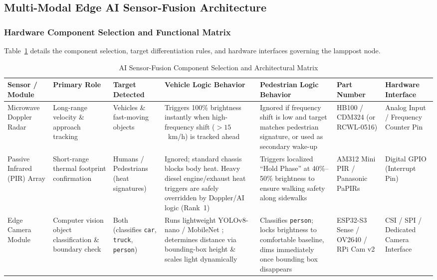 \documentclass[11pt,a4paper]{article}
\begin{document}
\subsection{Multi-Modal Edge AI Sensor-Fusion Architecture}

\subsubsection{Hardware Component Selection and Functional Matrix}
Table~\ref{tab:sensor_matrix} details the component selection, target differentiation rules, and hardware interfaces governing the lamppost node.

\begin{table}[tbp]
\centering
\caption{AI Sensor-Fusion Component Selection and Architectural Matrix}
\label{tab:sensor_matrix}
\footnotesize
\setlength{\tabcolsep}{3pt}
\begin{tabularx}{\textwidth}{>{\raggedright\arraybackslash}p{1.7cm}>{\raggedright\arraybackslash}p{1.9cm}>{\raggedright\arraybackslash}p{1.5cm}>{\raggedright\arraybackslash}X>{\raggedright\arraybackslash}X>{\raggedright\arraybackslash}p{1.8cm}>{\raggedright\arraybackslash}p{1.6cm}}
\toprule
\textbf{Sensor / Module} & \textbf{Primary Role} & \textbf{Target Detected} & \textbf{Vehicle Logic Behavior} & \textbf{Pedestrian Logic Behavior} & \textbf{Part Number} & \textbf{Hardware Interface} \\
\midrule
Microwave Doppler Radar & Long-range velocity \& approach tracking & Vehicles \& fast-moving objects & Triggers 100\% brightness instantly when high-frequency shift (\(>15\)~km/h) is tracked ahead & Ignored if frequency shift is low and target matches pedestrian signature, or used as secondary wake-up & HB100 / CDM324 (or RCWL-0516) & Analog Input / Frequency Counter Pin \\
\midrule
Passive Infrared (PIR) Array & Short-range thermal footprint confirmation & Humans / Pedestrians (heat signatures) & Ignored; standard chassis blocks body heat. Heavy diesel engine/exhaust heat triggers are safely overridden by Doppler/AI logic (Rank~1) & Triggers localized ``Hold Phase'' at 40\%--50\% brightness to ensure walking safety along sidewalks & AM312 Mini PIR / Panasonic PaPIRs & Digital GPIO (Interrupt Pin) \\
\midrule
Edge Camera Module & Computer vision object classification \& boundary check & Both (classifies \texttt{car}, \texttt{truck}, \texttt{person}) & Runs lightweight YOLOv8-nano \cite{redmon_yolo} / MobileNet \cite{howard2017mobilenets}; determines distance via bounding-box height \& scales light dynamically & Classifies \texttt{person}; locks brightness to comfortable baseline, dims immediately once bounding box disappears & ESP32-S3 Sense / OV2640 / RPi Cam v2 & CSI / SPI / Dedicated Camera Interface \\

\end{tabularx}
\end{table}
\end{document}
